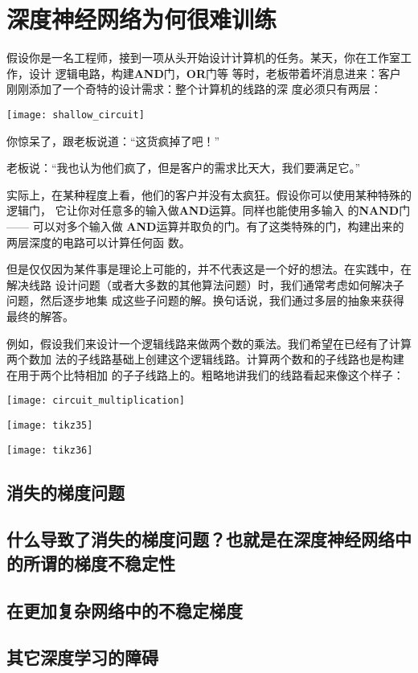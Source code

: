 
\chapter{深度神经网络为何很难训练}
\label{ch:WhyHardToTrain}

假设你是一名工程师，接到一项从头开始设计计算机的任务。某天，你在工作室工作，设计
逻辑电路，构建{\bfseries\SourceSerifPro AND}门，{\bfseries\SourceSerifPro OR}门等
等时，老板带着坏消息进来：客户刚刚添加了一个奇特的设计需求：整个计算机的线路的深
度必须只有两层：
\begin{center}
  \texttt{[image: shallow\_circuit]}
\end{center}

你惊呆了，跟老板说道：“这货疯掉了吧！”
 
老板说：“我也认为他们疯了，但是客户的需求比天大，我们要满足它。”
 
实际上，在某种程度上看，他们的客户并没有太疯狂。假设你可以使用某种特殊的逻辑门，
它让你对任意多的输入做{\bfseries\SourceSerifPro AND}运算。同样也能使用多输入
的{\bfseries\SourceSerifPro NAND}门 —— 可以对多个输入做{\bfseries\SourceSerifPro
  AND}运算并取负的门。有了这类特殊的门，构建出来的两层深度的电路可以计算任何函
数。

但是仅仅因为某件事是理论上可能的，并不代表这是一个好的想法。在实践中，在解决线路
设计问题（或者大多数的其他算法问题）时，我们通常考虑如何解决子问题，然后逐步地集
成这些子问题的解。换句话说，我们通过多层的抽象来获得最终的解答。

例如，假设我们来设计一个逻辑线路来做两个数的乘法。我们希望在已经有了计算两个数加
法的子线路基础上创建这个逻辑线路。计算两个数和的子线路也是构建在用于两个比特相加
的子子线路上的。粗略地讲我们的线路看起来像这个样子：
\begin{center}
  \texttt{[image: circuit\_multiplication]}
\end{center}

\begin{center}
  \texttt{[image: tikz35]}
\end{center}

\begin{center}
  \texttt{[image: tikz36]}
\end{center}

\section{消失的梯度问题}
\label{sec:the_vanishing_gradient_problem}

\section{什么导致了消失的梯度问题？也就是在深度神经网络中的所谓的梯度不稳定性}

\section{在更加复杂网络中的不稳定梯度}

\section{其它深度学习的障碍}
